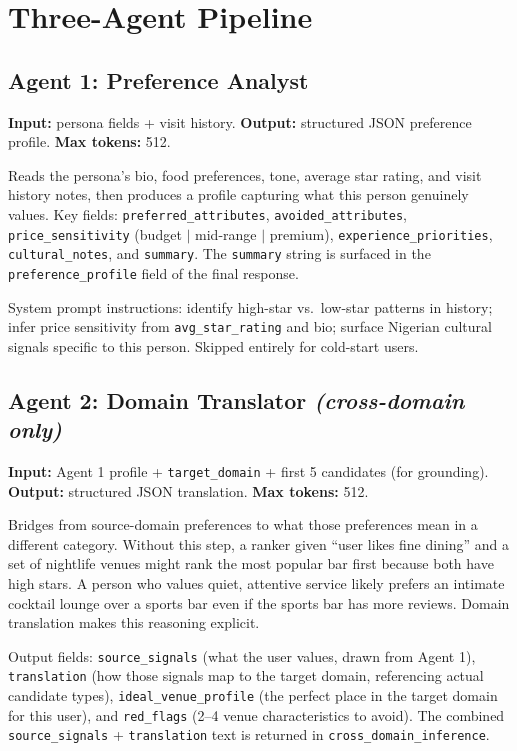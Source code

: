 \documentclass[11pt]{article}
\begin{document}
\section{Three-Agent Pipeline}

\subsection{Agent 1: Preference Analyst}

\textbf{Input:} persona fields + visit history. \textbf{Output:} structured JSON preference profile. \textbf{Max tokens:} 512.

Reads the persona's bio, food preferences, tone, average star rating, and visit history notes, then produces a profile capturing what this person genuinely values. Key fields: \texttt{preferred\_attributes}, \texttt{avoided\_attributes}, \texttt{price\_sensitivity} (budget $|$ mid-range $|$ premium), \texttt{experience\_priorities}, \texttt{cultural\_notes}, and \texttt{summary}. The \texttt{summary} string is surfaced in the \texttt{preference\_profile} field of the final response.

System prompt instructions: identify high-star vs.\ low-star patterns in history; infer price sensitivity from \texttt{avg\_star\_rating} and bio; surface Nigerian cultural signals specific to this person. Skipped entirely for cold-start users.

\subsection{Agent 2: Domain Translator \textit{(cross-domain only)}}

\textbf{Input:} Agent 1 profile + \texttt{target\_domain} + first 5 candidates (for grounding). \textbf{Output:} structured JSON translation. \textbf{Max tokens:} 512.

Bridges from source-domain preferences to what those preferences mean in a different category. Without this step, a ranker given ``user likes fine dining'' and a set of nightlife venues might rank the most popular bar first because both have high stars. A person who values quiet, attentive service likely prefers an intimate cocktail lounge over a sports bar even if the sports bar has more reviews. Domain translation makes this reasoning explicit.

Output fields: \texttt{source\_signals} (what the user values, drawn from Agent 1), \texttt{translation} (how those signals map to the target domain, referencing actual candidate types), \texttt{ideal\_venue\_profile} (the perfect place in the target domain for this user), and \texttt{red\_flags} (2–4 venue characteristics to avoid). The combined \texttt{source\_signals} + \texttt{translation} text is returned in \texttt{cross\_domain\_inference}.
\end{document}

